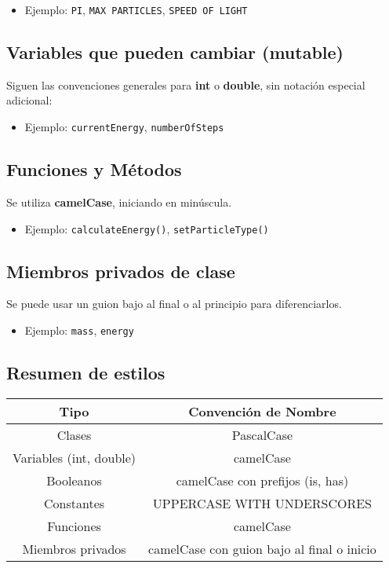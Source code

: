 \begin{itemize}
\item Ejemplo: \texttt{PI}, \texttt{MAX PARTICLES}, \texttt{SPEED OF LIGHT}
\end{itemize}

\subsection{Variables que pueden cambiar (mutable)}
Siguen las convenciones generales para \textbf{int} o \textbf{double}, sin notación especial adicional:

\begin{itemize}
\item Ejemplo: \texttt{currentEnergy}, \texttt{numberOfSteps}
\end{itemize}

\subsection{Funciones y Métodos}
Se utiliza \textbf{camelCase}, iniciando en minúscula.

\begin{itemize}
\item Ejemplo: \texttt{calculateEnergy()}, \texttt{setParticleType()}
\end{itemize}

\subsection{Miembros privados de clase}
Se puede usar un guion bajo al final o al principio para diferenciarlos.

\begin{itemize}
\item Ejemplo: \texttt{mass}, \texttt{energy}
\end{itemize}

\subsection{Resumen de estilos}
\begin{tabular}{|c|c|}
\hline
Tipo & Convención de Nombre \\
\hline
Clases & PascalCase \\
Variables (int, double) & camelCase \\
Booleanos & camelCase con prefijos (is, has) \\
Constantes & UPPERCASE WITH UNDERSCORES \\
Funciones & camelCase \\
Miembros privados & camelCase con guion bajo al final o inicio \\
\hline
\end{tabular}